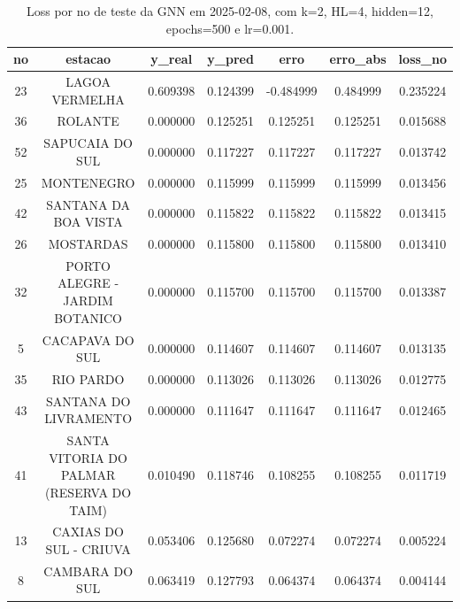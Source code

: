 \begin{table}[h]
\centering
\caption{Loss por no de teste da GNN em 2025-02-08, com k=2, HL=4, hidden=12, epochs=500 e lr=0.001.}
\label{tab:gnn_loss_k2_hl4_h12_e500_d20250208}
\begin{tabular}{ccccccc}
\toprule
no & estacao & y\_real & y\_pred & erro & erro\_abs & loss\_no \\
\midrule
23 & LAGOA VERMELHA & 0.609398 & 0.124399 & -0.484999 & 0.484999 & 0.235224 \\
36 & ROLANTE & 0.000000 & 0.125251 & 0.125251 & 0.125251 & 0.015688 \\
52 & SAPUCAIA DO SUL & 0.000000 & 0.117227 & 0.117227 & 0.117227 & 0.013742 \\
25 & MONTENEGRO & 0.000000 & 0.115999 & 0.115999 & 0.115999 & 0.013456 \\
42 & SANTANA DA BOA VISTA & 0.000000 & 0.115822 & 0.115822 & 0.115822 & 0.013415 \\
26 & MOSTARDAS & 0.000000 & 0.115800 & 0.115800 & 0.115800 & 0.013410 \\
32 & PORTO ALEGRE - JARDIM BOTANICO & 0.000000 & 0.115700 & 0.115700 & 0.115700 & 0.013387 \\
5 & CACAPAVA DO SUL & 0.000000 & 0.114607 & 0.114607 & 0.114607 & 0.013135 \\
35 & RIO PARDO & 0.000000 & 0.113026 & 0.113026 & 0.113026 & 0.012775 \\
43 & SANTANA DO LIVRAMENTO & 0.000000 & 0.111647 & 0.111647 & 0.111647 & 0.012465 \\
41 & SANTA VITORIA DO PALMAR (RESERVA DO TAIM) & 0.010490 & 0.118746 & 0.108255 & 0.108255 & 0.011719 \\
13 & CAXIAS DO SUL - CRIUVA & 0.053406 & 0.125680 & 0.072274 & 0.072274 & 0.005224 \\
8 & CAMBARA DO SUL & 0.063419 & 0.127793 & 0.064374 & 0.064374 & 0.004144 \\
\bottomrule
\end{tabular}
\end{table}
